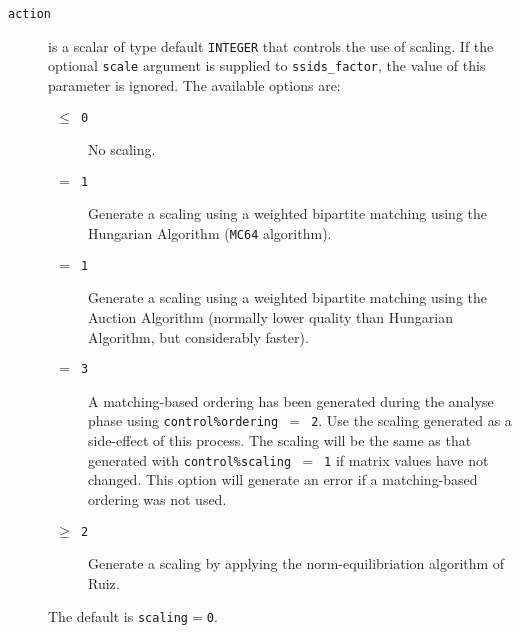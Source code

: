 \documentclass{spral}
\begin{document}
\begin{description}
\item[\texttt{action}] is a scalar of type default {\tt INTEGER} that controls
the use of scaling. If the optional {\tt scale} argument is supplied to
{\tt ssids\_factor}, the value of this parameter is ignored. The available
options are:
\begin{description}
   \item[\texttt{ $\le$ 0 }] No scaling.
   \item[\texttt{ $=$ 1 }] Generate a scaling using a weighted bipartite matching using
      the Hungarian Algorithm (\texttt{MC64} algorithm).
   \item[\texttt{ $=$ 1 }] Generate a scaling using a weighted bipartite matching using
      the Auction Algorithm (normally lower quality than Hungarian Algorithm, but considerably faster).
   \item[\texttt{ $=$ 3 }] A matching-based ordering has been generated during the
      analyse phase using {\tt control\%ordering $=$ 2}. Use the
      scaling generated as a side-effect of this process. The scaling will be
      the same as that generated with {\tt control\%scaling $=$ 1} if matrix
      values have not changed. This option will generate an error if a
      matching-based ordering was not used.
   \item[\texttt{ $\ge$ 2 }] Generate a scaling by applying the norm-equilibriation
      algorithm of Ruiz.
\end{description}
The default is {\tt scaling}$=${\tt 0}.

\end{description}

\end{document}

